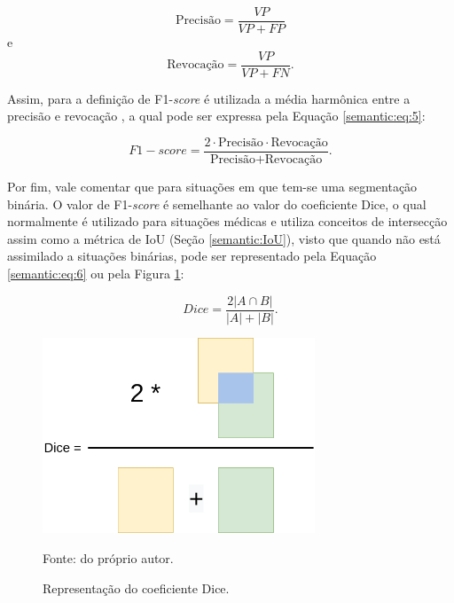 \begin{equation}
    \label{semantic:eq:3}
    \text{Precisão} = \frac{VP}{VP + FP}
\end{equation}
e
\begin{equation}
    \label{semantic:eq:4}
    \text{Revocação} = \frac{VP}{VP + FN}.
\end{equation}

Assim, para a definição de F1-\textit{score} é utilizada a média harmônica entre a precisão e revocação \citep{Minaee2021}, a qual pode ser expressa pela Equação \ref{semantic:eq:5}:

\begin{equation}
    \label{semantic:eq:5}
    F1-score = \frac{2 \cdot \text{Precisão} \cdot \text{Revocação}}{\text{Precisão} + \text{Revocação}}.
\end{equation}

Por fim, vale comentar que para situações em que tem-se uma segmentação binária. O valor de F1-\textit{score} é semelhante ao valor do coeficiente Dice, o qual normalmente é utilizado para situações médicas \citep{Minaee2021} e utiliza conceitos de intersecção assim como a métrica de IoU (Seção \ref{semantic:IoU}), visto que quando não está assimilado a situações binárias, pode ser representado pela Equação \ref{semantic:eq:6} ou pela Figura \ref{semantic:fig:2}:

\begin{equation}
    \label{semantic:eq:6}
    Dice = \frac{2|A \cap B|}{|A| + |B|}.
\end{equation}

\begin{figure}[H]
    \centering
    \caption{Representação do coeficiente Dice.}
    \includegraphics[height=2.3in]{recursos/imagens/semantic/dice.png}
    \label{semantic:fig:2}

    Fonte: do próprio autor.
\end{figure}

